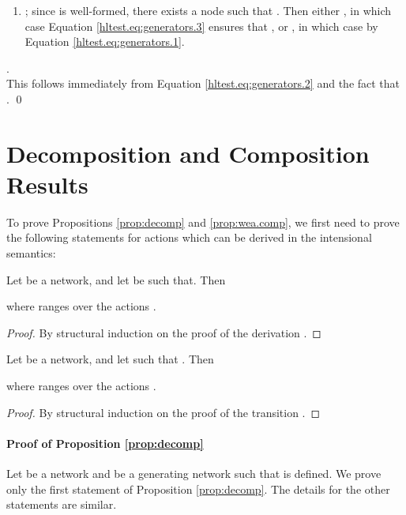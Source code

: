 \documentclass{LMCS}
\begin{document}
\begin{description}
\begin{enumerate}
\item ; since  is well-formed, there exists a node  
such that . Then either , in which case 
Equation \eqref{hltest.eq:generators.3} ensures that , or 
, in which case  by Equation \eqref{hltest.eq:generators.1}.
\end{enumerate}

\item[\textbf{Proof of Statement \ref{generators.5}}] .\\ 
This follows immediately from Equation \eqref{hltest.eq:generators.2} and the fact that . \hfill\qed
\end{description}

\section{Decomposition and Composition Results}
\label{sec:decomposition.results}
To prove Propositions \ref{prop:decomp} and \ref{prop:wea.comp}, 
we first need to prove the following statements for actions which 
can be derived in the intensional semantics: 
\begin{prop}[Weakening]
\label{prop:weakening}

Let  be a network, and let  be such 
that.
Then 

\noindent
where  ranges over the actions .
\end{prop}
\begin{proof}
By structural induction on the proof of the derivation 
.
\end{proof}

\begin{prop}[Strengthening]
\label{prop:strengthening}
Let  be a network, and let  such 
that .
Then 

\noindent
where  ranges over the actions .
\end{prop}

\begin{proof}
By structural induction on the proof of the transition 
.
\end{proof}

\paragraph{\textbf{Proof of Proposition \ref{prop:decomp}}}
\label{proof:decomp}
Let  be a network and  be 
a generating network such that  is defined. 
We prove only the first statement of Proposition \ref{prop:decomp}.  
The details for the other statements are similar. 
\end{document}
